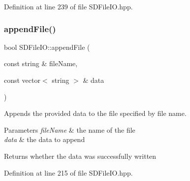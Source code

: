 Definition at line 239 of file S\+D\+File\+I\+O.\+hpp.


\begin{DoxyCode}{0}

\end{DoxyCode}
\mbox{\label{classSDFileIO_ab01f1777f4670c9cd4c04a0b3c6c2867}} 
\subsubsection{\texorpdfstring{appendFile()}{appendFile()}}
{\footnotesize\ttfamily bool S\+D\+File\+I\+O\+::append\+File (\begin{DoxyParamCaption}\item[{const string \&}]{file\+Name,  }\item[{const vector$<$ string $>$ \&}]{data }\end{DoxyParamCaption})\hspace{0.3cm}{\ttfamily [inline]}}

Appends the provided data to the file specified by file name.


\begin{DoxyParams}{Parameters}
{\em file\+Name} & the name of the file \\
\hline
{\em data} & the data to append \\
\hline
\end{DoxyParams}
\begin{DoxyReturn}{Returns}
whether the data was successfully written 
\end{DoxyReturn}


Definition at line 215 of file S\+D\+File\+I\+O.\+hpp.


